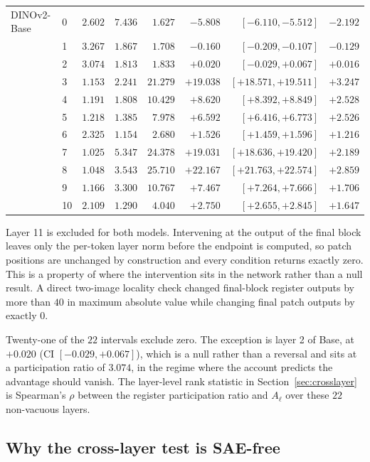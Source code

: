 \documentclass{article}
\begin{document}
\begin{table}[h]
\begin{tabular}{llrrrrrr}
\midrule
DINOv2-Base & 0 & $2.602$ & $7.436$ & $1.627$ & $-5.808$ & $[-6.110, -5.512]$ & $-2.192$ \\
 & 1 & $3.267$ & $1.867$ & $1.708$ & $-0.160$ & $[-0.209, -0.107]$ & $-0.129$ \\
 & 2 & $3.074$ & $1.813$ & $1.833$ & $+0.020$ & $[-0.029, +0.067]$ & $+0.016$ \\
 & 3 & $1.153$ & $2.241$ & $21.279$ & $+19.038$ & $[+18.571, +19.511]$ & $+3.247$ \\
 & 4 & $1.191$ & $1.808$ & $10.429$ & $+8.620$ & $[+8.392, +8.849]$ & $+2.528$ \\
 & 5 & $1.218$ & $1.385$ & $7.978$ & $+6.592$ & $[+6.416, +6.773]$ & $+2.526$ \\
 & 6 & $2.325$ & $1.154$ & $2.680$ & $+1.526$ & $[+1.459, +1.596]$ & $+1.216$ \\
 & 7 & $1.025$ & $5.347$ & $24.378$ & $+19.031$ & $[+18.636, +19.420]$ & $+2.189$ \\
 & 8 & $1.048$ & $3.543$ & $25.710$ & $+22.167$ & $[+21.763, +22.574]$ & $+2.859$ \\
 & 9 & $1.166$ & $3.300$ & $10.767$ & $+7.467$ & $[+7.264, +7.666]$ & $+1.706$ \\
 & 10 & $2.109$ & $1.290$ & $4.040$ & $+2.750$ & $[+2.655, +2.845]$ & $+1.647$ \\
\bottomrule
\end{tabular}
\end{table}

Layer 11 is excluded for both models. Intervening at the output of the final block leaves only the per-token layer norm before the endpoint is computed, so patch positions are unchanged by construction and every condition returns exactly zero. This is a property of where the intervention sits in the network rather than a null result. A direct two-image locality check changed final-block register outputs by more than $40$ in maximum absolute value while changing final patch outputs by exactly $0$.

Twenty-one of the $22$ intervals exclude zero. The exception is layer 2 of Base, at $+0.020$ (CI $[-0.029,+0.067]$), which is a null rather than a reversal and sits at a participation ratio of $3.074$, in the regime where the account predicts the advantage should vanish. The layer-level rank statistic in Section~\ref{sec:crosslayer} is Spearman's $\rho$ between the register participation ratio and $A_\ell$ over these $22$ non-vacuous layers.

\subsection{Why the cross-layer test is SAE-free}
\end{document}
